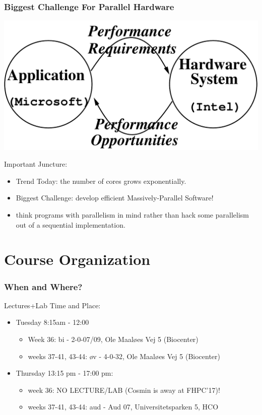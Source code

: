 \documentclass{beamer}
\renewcommand{\emph}[1]{\textcolor{structure}{#1}}
\newcommand{\emp}[1]{\textcolor{DikuRed}{ #1}}
\begin{document}
\begin{frame}[fragile,t]
\frametitle{Biggest Challenge For Parallel Hardware}

\bigskip

\includegraphics[width=29ex]{Figures/L1/Synergy}
\bigskip\pause


\emp{Important Juncture:}\medskip
\begin{itemize}
            \item \emph{Trend Today: the number of cores grows exponentially.}\medskip
            \item \alert{Biggest Challenge: develop efficient Massively-Parallel Software!}\medskip
            \item think programs with parallelism in mind rather 
                    than hack \alert{some} parallelism out of a sequential implementation.
\end  {itemize}
\end{frame}


\section{Course Organization}

\begin{frame}[fragile]
	\tableofcontents[currentsection]
\end{frame}

\begin{frame}[fragile]
\frametitle{When and Where?}
    Lectures+Lab Time and Place:\bigskip
    \begin{itemize}
        \item Tuesday 8:15am - 12:00\medskip
            \begin{itemize}
                \item Week 36: bi - 2-0-07/09, Ole Maaløes Vej 5 (Biocenter)\medskip
                \item weeks 37-41, 43-44:  øv - 4-0-32,     Ole Maaløes Vej 5 (Biocenter)
            \end{itemize}\bigskip
        \item Thursday 13:15 pm - 17:00 pm:\medskip
            \begin{itemize}
                \item  week 36: NO LECTURE/LAB (Cosmin is away at FHPC'17)!\medskip
                \item weeks 37-41, 43-44: aud - Aud 07, Universitetsparken 5, HCO
            \end{itemize}
    \end{itemize}  
\end{frame}
\end{document}
